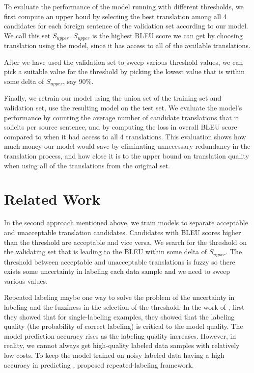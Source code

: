 \documentclass[11pt]{article}
\begin{document}
To evaluate the performance of the model running with different thresholds, we first compute an upper boud by selecting the best translation among all 4 candidates for each foreign sentence of the validation set according to our  model. We call this set $S_{upper}$.  $S_{upper}$ is the highest BLEU score we can get by choosing translation using the model, since it has access to all of the available translations.  

After we have used the validation set to sweep various threshold values,  we can pick a suitable value for the threshold by picking the lowest value that is within some delta of $S_{upper}$, say  90$\%$. 

Finally, we retrain our model using the union set of the training set and validation set, use the resulting model on the test set.  We evaluate the model's performance by counting the average number of candidate translations that it solicits per source sentence, and by computing the loss in overall BLEU score compared to when it had access to all 4 translations.  This evaluation shows how much money our model would save by eliminating unnecessary redundancy in the translation process, and how close it is to the upper bound on translation quality when using all of the translations from the original set.

\section{Related Work}
In the second approach mentioned above, we train models to separate acceptable and unacceptable translation candidates. Candidates with BLEU scores higher than the threshold are acceptable and vice versa. We search for the threshold on the validating set that is leading to the BLEU within some delta of $S_{upper}$.  The threshold between acceptable and unacceptable translations is fuzzy so there exists some uncertainty in labeling each data sample and we need to sweep various values. 

Repeated labeling \cite{sheng2008get} maybe one way to solve the problem of the  uncertainty in labeling and the fuzziness in the selection of the threshold. In the work of \cite{sheng2008get}, first they showed that for single-labeling examples, they showed that the labeling quality (the probability of correct labeling) is critical to the model quality. The model prediction accuracy rises as the labeling quality increases. However, in reality, we cannot always get high-quality labeled data samples with relatively low costs. To keep the model trained on noisy labeled data having a high accuracy in predicting ,  proposed repeated-labeling framework. 
\end{document}
